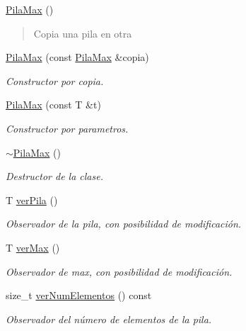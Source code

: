 \begin{DoxyCompactItemize}
\item 
\mbox{\hyperlink{classPilaMax_a75df9c3622957f933f913b2f09d7bca3}{Pila\+Max}} ()
\begin{DoxyCompactList}\small\item\em \begin{quote}
Copia una pila en otra \end{quote}
\end{DoxyCompactList}\item 
\mbox{\hyperlink{classPilaMax_a1914e19e78e389744e898a44e1308a25}{Pila\+Max}} (const \mbox{\hyperlink{classPilaMax}{Pila\+Max}} \&copia)
\begin{DoxyCompactList}\small\item\em Constructor por copia. \end{DoxyCompactList}\item 
\mbox{\hyperlink{classPilaMax_a6d3aa1ef82b270c7a3c827eac9324497}{Pila\+Max}} (const T \&t)
\begin{DoxyCompactList}\small\item\em Constructor por parametros. \end{DoxyCompactList}\item 
\mbox{\label{classPilaMax_aa6f6b406f7e8cc99a0123bb174f4d7b7}} 
\mbox{\hyperlink{classPilaMax_aa6f6b406f7e8cc99a0123bb174f4d7b7}{$\sim$\+Pila\+Max}} ()
\begin{DoxyCompactList}\small\item\em Destructor de la clase. \end{DoxyCompactList}\item 
T \mbox{\hyperlink{classPilaMax_a106ddeebac120bce70bf95ffd59ebfc7}{ver\+Pila}} ()
\begin{DoxyCompactList}\small\item\em Observador de la pila, con posibilidad de modificación. \end{DoxyCompactList}\item 
T \mbox{\hyperlink{classPilaMax_a24ae04b87304dbe6640d4e28ea875990}{ver\+Max}} ()
\begin{DoxyCompactList}\small\item\em Observador de max, con posibilidad de modificación. \end{DoxyCompactList}\item 
size\+\_\+t \mbox{\hyperlink{classPilaMax_aed2d236773d9232ceda548339bfe60b7}{ver\+Num\+Elementos}} () const
\begin{DoxyCompactList}\small\item\em Observador del número de elementos de la pila. \end{DoxyCompactList}\item 

\end{DoxyCompactItemize}
